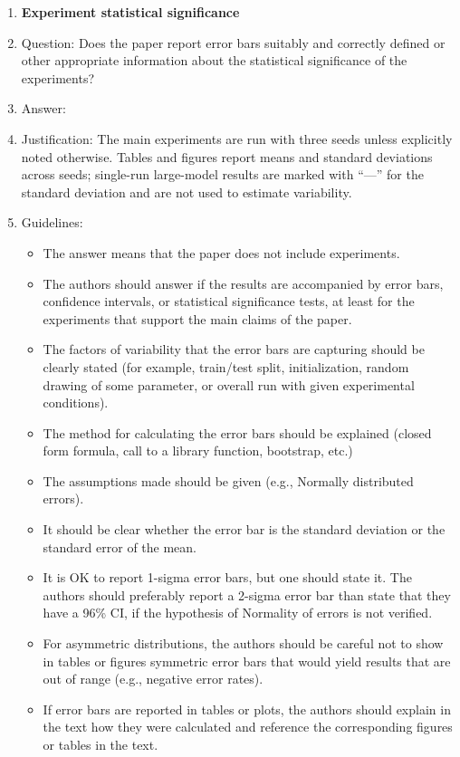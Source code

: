 \documentclass{article}
\theoremstyle{plain}
\theoremstyle{definition}
\theoremstyle{remark}
\begin{document}
\begin{enumerate}
\item {\bf Experiment statistical significance}
    \item[] Question: Does the paper report error bars suitably and correctly defined or other appropriate information about the statistical significance of the experiments?
    \item[] Answer: \answerYes{}
    \item[] Justification: The main experiments are run with three seeds unless explicitly noted otherwise. Tables and figures report means and standard deviations across seeds; single-run large-model results are marked with ``---'' for the standard deviation and are not used to estimate variability.
    \item[] Guidelines:
    \begin{itemize}
        \item The answer \answerNA{} means that the paper does not include experiments.
        \item The authors should answer \answerYes{} if the results are accompanied by error bars, confidence intervals, or statistical significance tests, at least for the experiments that support the main claims of the paper.
        \item The factors of variability that the error bars are capturing should be clearly stated (for example, train/test split, initialization, random drawing of some parameter, or overall run with given experimental conditions).
        \item The method for calculating the error bars should be explained (closed form formula, call to a library function, bootstrap, etc.)
        \item The assumptions made should be given (e.g., Normally distributed errors).
        \item It should be clear whether the error bar is the standard deviation or the standard error of the mean.
        \item It is OK to report 1-sigma error bars, but one should state it. The authors should preferably report a 2-sigma error bar than state that they have a 96\% CI, if the hypothesis of Normality of errors is not verified.
        \item For asymmetric distributions, the authors should be careful not to show in tables or figures symmetric error bars that would yield results that are out of range (e.g., negative error rates).
        \item If error bars are reported in tables or plots, the authors should explain in the text how they were calculated and reference the corresponding figures or tables in the text.
    \end{itemize}


\end{enumerate}
\end{document}
